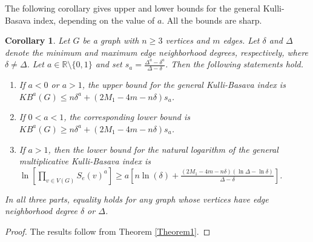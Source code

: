 \documentclass[11pt, oneside]{amsart}   	%
\newtheorem{cor}[theorem]{Corollary}
\theoremstyle{definition}
\theoremstyle{remark}
\numberwithin{equation}{section}
\begin{document}
The following corollary gives upper and lower bounds for the general Kulli-Basava index, depending on the value of $a$. All the bounds are sharp.

\begin{cor}\label{Cor1}
Let $G$ be a graph with $n\geq 3$ vertices and $m$ edges. Let $\delta$ and $\Delta$ denote the minimum and maximum edge neighborhood degrees, respectively, where $\delta\neq\Delta$. Let $a\in\mathbb{R}\setminus\{0,1\}$ and set $s_a=\frac{\Delta^a-\delta^a}{\Delta-\delta}$. Then the following statements hold.

\begin{enumerate}
        \item If $a < 0$ or $a > 1$, the upper bound for the general Kulli-Basava index is $ KB^a(G) \leq n\delta^a +  (2M_1 - 4m - n\delta)s_a$.

    
    \item If $0<a<1$, the corresponding lower bound is $KB^a(G)\geq n\delta^a+(2M_1-4m-n\delta)s_a$.

    \item If $a>1$, then the lower bound for the natural logarithm of the general multiplicative Kulli-Basava index is 
$\ln\left[\prod_{v\in V(G)}S_e(v)^a\right]\geq a\left[n\ln(\delta)+\frac{(2M_1-4m-n\delta)(\ln\Delta-\ln\delta)}{\Delta-\delta}\right]$.
    

\end{enumerate}
In all three parts, equality holds for any graph whose vertices have edge neighborhood degree $\delta$ or $\Delta$.
\end{cor}

\begin{proof}
The results follow from Theorem \ref{Theorem1}.
\end{proof}
\end{document}
